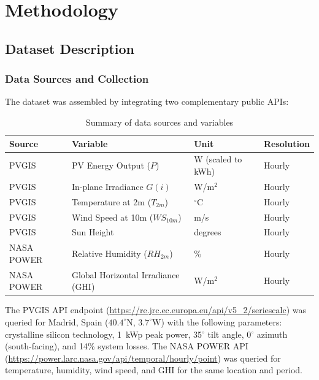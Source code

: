 \documentclass[11pt, a4paper]{article}
\begin{document}
\section{Methodology}\label{sec:methodology}

\subsection{Dataset Description}

\subsubsection{Data Sources and Collection}

The dataset was assembled by integrating two complementary public APIs:

\begin{table}[H]
    \centering
    \caption{Summary of data sources and variables}\label{tab:sources}
    \begin{tcolorbox}[colback=lightgray, colframe=rulecolor, boxrule=0.5pt, arc=4mm, auto outer arc, width=0.98\textwidth, halign=center]
        \renewcommand{\arraystretch}{1.5}
        \begin{tabular}{@{}llll@{}}
        \toprule
        \textbf{Source} & \textbf{Variable} & \textbf{Unit} & \textbf{Resolution} \\
        \midrule
        PVGIS & PV Energy Output ($P$) & W (scaled to kWh) & Hourly \\
        PVGIS & In-plane Irradiance $G(i)$ & W/m$^2$ & Hourly \\
        PVGIS & Temperature at 2m ($T_{2m}$) & $^\circ$C & Hourly \\
        PVGIS & Wind Speed at 10m ($WS_{10m}$) & m/s & Hourly \\
        PVGIS & Sun Height & degrees & Hourly \\
        NASA POWER & Relative Humidity ($RH_{2m}$) & \% & Hourly \\
        NASA POWER & Global Horizontal Irradiance (GHI) & W/m$^2$ & Hourly \\
        \bottomrule
        \end{tabular}
    \end{tcolorbox}
\end{table}

The PVGIS API endpoint (\url{https://re.jrc.ec.europa.eu/api/v5_2/seriescalc})
was queried for Madrid, Spain ($40.4^\circ$N, $3.7^\circ$W) with the following
parameters: crystalline silicon technology, 1~kWp peak power, 35$^\circ$ tilt
angle, 0$^\circ$ azimuth (south-facing), and 14\% system losses. The NASA POWER
API (\url{https://power.larc.nasa.gov/api/temporal/hourly/point}) was queried
for temperature, humidity, wind speed, and GHI for the same location and period.
\end{document}
